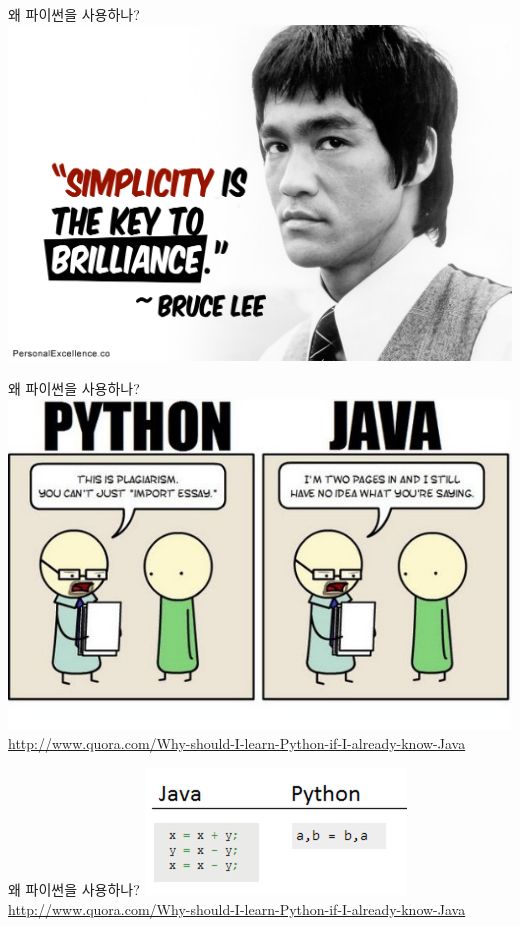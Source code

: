 \documentclass[10pt]{beamer}
\begin{document}
\begin{frame}{왜 파이썬을 사용하나?}{}
	\centering
	\includegraphics[scale=0.28]{contents/simplicity.jpg}
\end{frame}

\begin{frame}{왜 파이썬을 사용하나?}{}
	\centering
	\includegraphics[scale=1.2]{contents/java.jpg}\\
	\tiny{\url{http://www.quora.com/Why-should-I-learn-Python-if-I-already-know-Java}}
\end{frame}

\begin{frame}{왜 파이썬을 사용하나?}{}
	\centering
	\includegraphics[scale=1]{contents/java2.png}\\
	\tiny{\url{http://www.quora.com/Why-should-I-learn-Python-if-I-already-know-Java}}
\end{frame}
\end{document}
